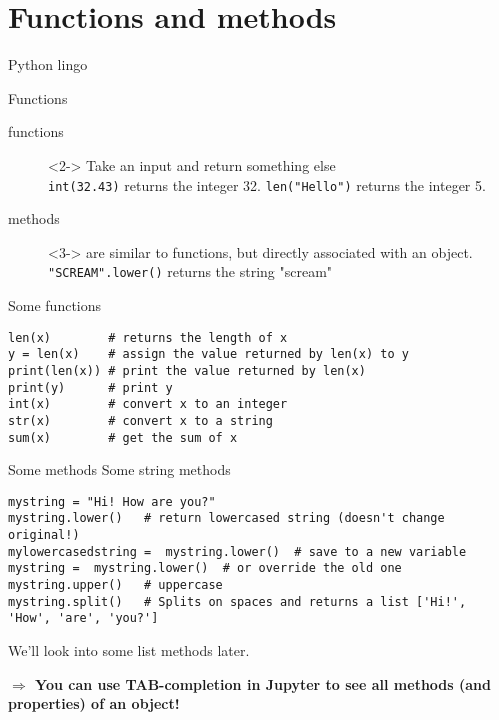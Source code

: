 \section{Functions and methods}
\begin{frame}{Python lingo}
	\begin{block}{Functions}
		\begin{description}
			\item[{\color{red}functions}]<2-> Take an input and return something else \\ {\tt{int(32.43})} returns the integer 32. \texttt{len("Hello")} returns the integer 5.\\ 
			\item[{\color{red}methods}]<3-> are similar to functions, but directly associated with an object. {\tt{"SCREAM".lower()}} returns the string "scream"
		\end{description}
	\end{block}
\end{frame}



\begin{frame}[fragile]{Some functions}
\begin{verbatim}
len(x)        # returns the length of x
y = len(x)    # assign the value returned by len(x) to y
print(len(x)) # print the value returned by len(x)
print(y)      # print y
int(x)        # convert x to an integer
str(x)        # convert x to a string
sum(x)        # get the sum of x
\end{verbatim}
\end{frame}





\begin{frame}[fragile]{Some methods}
Some string methods
\begin{verbatim}
mystring = "Hi! How are you?"
mystring.lower()   # return lowercased string (doesn't change original!)
mylowercasedstring =  mystring.lower()  # save to a new variable
mystring =  mystring.lower()  # or override the old one
mystring.upper()   # uppercase
mystring.split()   # Splits on spaces and returns a list ['Hi!', 'How', 'are', 'you?']
\end{verbatim}

We'll look into some list methods later.

\textbf{$\Rightarrow$ You can use TAB-completion in Jupyter to see all methods (and properties) of an object!}
\end{frame}



